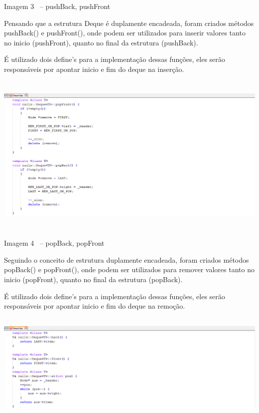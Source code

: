 \documentclass[a4paper]{article}
\begin{document}
{\centering\color{black}
Imagem 3 \ – pushBack, pushFront
\par}


\bigskip

{\color{black}
\textcolor[rgb]{0.13333334,0.13333334,0.13333334}{Pensando que a
estrutura Deque é duplamente encadeada, foram criados métodos
pushBack() e pushFront(), onde podem ser utilizados para inserir
valores tanto no inicio (pushFront), quanto no final da estrutura
(pushBack).}}

{\color{black}
\textcolor[rgb]{0.13333334,0.13333334,0.13333334}{É utilizado dois
define’s para a implementação dessas funções, eles serão responsáveis
por apontar inicio e fim do deque }na inserção.}


\includegraphics[width=6.2709in,height=3.0835in]{Tra1n-img/Tra1n-img5.png}


{\centering\color{black}
Imagem 4 \ – popBack, popFront
\par}


\bigskip


\bigskip

{\color{black}
\textcolor[rgb]{0.13333334,0.13333334,0.13333334}{Seguindo o conceito de
estrutura duplamente encadeada, foram criados métodos popBack() e
popFront(), onde podem ser utilizados para remover valores tanto no
inicio (popFront), quanto no final da estrutura (popBack).}}

{\color{black}
\textcolor[rgb]{0.13333334,0.13333334,0.13333334}{É utilizado dois
define’s para a implementação dessas funções, eles serão responsáveis
por apontar inicio e fim do deque }na remoção.}


\includegraphics[width=6.2709in,height=2.0693in]{Tra1n-img/Tra1n-img6.png}
\end{document}
